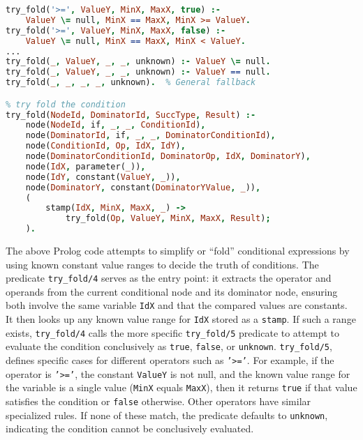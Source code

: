 \newpage
\begin{lstlisting}[language=Prolog]
% Constant condition: value stamp available and deterministic
try_fold('>=', ValueY, MinX, MaxX, true) :- 
    ValueY \= null, MinX == MaxX, MinX >= ValueY.
try_fold('>=', ValueY, MinX, MaxX, false) :- 
    ValueY \= null, MinX == MaxX, MinX < ValueY.
...
try_fold(_, ValueY, _, _, unknown) :- ValueY \= null.
try_fold(_, ValueY, _, _, unknown) :- ValueY == null.
try_fold(_, _, _, _, unknown).  % General fallback

% try fold the condition
try_fold(NodeId, DominatorId, SuccType, Result) :-
    node(NodeId, if, _, _, ConditionId),
    node(DominatorId, if, _, _, DominatorConditionId),
    node(ConditionId, Op, IdX, IdY),
    node(DominatorConditionId, DominatorOp, IdX, DominatorY),
    node(IdX, parameter(_)),
    node(IdY, constant(ValueY, _)),
    node(DominatorY, constant(DominatorYValue, _)),
    (
        stamp(IdX, MinX, MaxX, _) ->
            try_fold(Op, ValueY, MinX, MaxX, Result);
    ).
\end{lstlisting}
\smallbreak
The above Prolog code attempts to simplify or “fold” conditional expressions by using known constant value ranges to decide the truth of conditions. The predicate \texttt{try\_fold/4} serves as the entry point: it extracts the operator and operands from the current conditional node and its dominator node, ensuring both involve the same variable \texttt{IdX} and that the compared values are constants. It then looks up any known value range for \texttt{IdX} stored as a \texttt{stamp}. If such a range exists, \texttt{try\_fold/4} calls the more specific \texttt{try\_fold/5} predicate to attempt to evaluate the condition conclusively as \texttt{true}, \texttt{false}, or \texttt{unknown}. \texttt{try\_fold/5}, defines specific cases for different operators such as \texttt{'>='}. For example, if the operator is \texttt{'>='}, the constant \texttt{ValueY} is not null, and the known value range for the variable is a single value (\texttt{MinX} equals \texttt{MaxX}), then it returns \texttt{true} if that value satisfies the condition or \texttt{false} otherwise. Other operators have similar specialized rules. If none of these match, the predicate defaults to \texttt{unknown}, indicating the condition cannot be conclusively evaluated.

